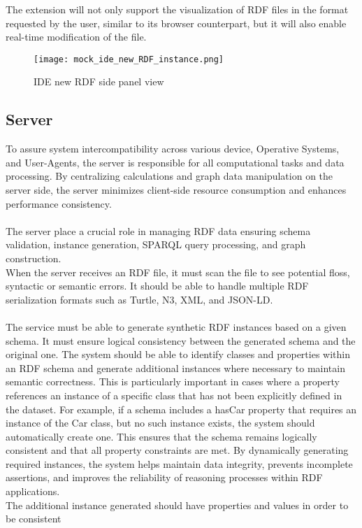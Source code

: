   The extension will not only support the visualization of RDF files in the format requested by the user, similar to its browser counterpart, but it will also enable real-time modification of the file.

  \begin{figure}[H]
      \centering
      \texttt{[image: mock\_ide\_new\_RDF\_instance.png]}\\
      \caption{IDE new RDF side panel view}\label{fig:IDERDFReader}
    \end{figure}

  \subsection{Server\label{sec:server}}
  To assure system intercompatibility across various device, Operative Systems, and User-Agents, the server is responsible for all computational tasks and data processing. By centralizing calculations and graph data manipulation on the server side, the server minimizes client-side resource consumption and enhances performance consistency. 
  \\
  \\
  The server place a crucial role in managing RDF data ensuring  schema validation, instance generation, SPARQL query processing, and graph construction.
  \\
  When the server receives an RDF file, it must scan the file to see potential floss, syntactic or semantic errors. It should be able to handle multiple RDF serialization formats such as Turtle, N3, XML, and JSON-LD. 
  \\
  \\
  The service must be able to generate synthetic RDF instances based on a given schema. It must ensure logical consistency between the generated schema and the original one.
  The system should be able to identify classes and properties within an RDF schema and generate additional instances where necessary to maintain semantic correctness. This is particularly important in cases where a property references an instance of a specific class that has not been explicitly defined in the dataset.
  For example, if a schema includes a hasCar property that requires an instance of the Car class, but no such instance exists, the system should automatically create one. This ensures that the schema remains logically consistent and that all property constraints are met. By dynamically generating required instances, the system helps maintain data integrity, prevents incomplete assertions, and improves the reliability of reasoning processes within RDF applications.
  \\ 
  The additional instance generated should have properties and values in order to be consistent
